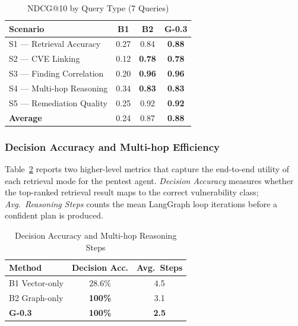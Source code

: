 \documentclass[conference]{IEEEtran}
\begin{document}
\begin{table}[htbp]
  \centering
  \caption{NDCG@10 by Query Type (7 Queries)}
  \label{tab:ndcg}
  \begin{tabular}{lccc}
    \toprule
    \textbf{Scenario} & \textbf{B1} & \textbf{B2} & \textbf{G-0.3} \\
    \midrule
    S1 — Retrieval Accuracy  & 0.27 & 0.84 & \textbf{0.88} \\
    S2 — CVE Linking         & 0.12 & \textbf{0.78} & \textbf{0.78} \\
    S3 — Finding Correlation & 0.20 & \textbf{0.96} & \textbf{0.96} \\
    S4 — Multi-hop Reasoning & 0.34 & \textbf{0.83} & \textbf{0.83} \\
    S5 — Remediation Quality & 0.25 & 0.92 & \textbf{0.92} \\
    \midrule
    \textbf{Average}         & 0.24 & 0.87 & \textbf{0.88} \\
    \bottomrule
  \end{tabular}
\end{table}

\subsubsection{Decision Accuracy and Multi-hop Efficiency}

Table~\ref{tab:decision} reports two higher-level metrics that capture
the end-to-end utility of each retrieval mode for the pentest agent.
\emph{Decision Accuracy} measures whether the top-ranked retrieval result
maps to the correct vulnerability class; \emph{Avg.\ Reasoning Steps}
counts the mean LangGraph loop iterations before a confident plan is produced.

\begin{table}[htbp]
  \centering
  \caption{Decision Accuracy and Multi-hop Reasoning Steps}
  \label{tab:decision}
  \begin{tabular}{lcc}
    \toprule
    \textbf{Method} & \textbf{Decision Acc.} & \textbf{Avg.\ Steps} \\
    \midrule
    B1 Vector-only  & 28.6\%         & 4.5 \\
    B2 Graph-only   & \textbf{100\%} & 3.1 \\
    \textbf{G-0.3}  & \textbf{100\%} & \textbf{2.5} \\
    \bottomrule
  \end{tabular}
\end{table}
\end{document}
